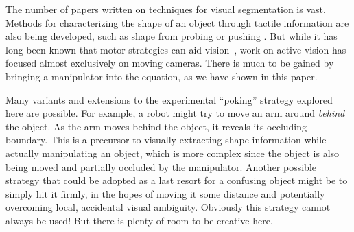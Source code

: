 \ifverbose
The number of papers written on techniques for visual segmentation is
vast.  Methods for characterizing the shape of an object through
tactile information are also being developed, such as shape from
probing 
\cite{paulos99fast} 
or pushing
\cite{moll01reconstructing}.
But while it has long
been known that motor strategies can aid
vision~\cite{ballard91animate}, work on active vision has focused
almost exclusively on moving cameras.  There is much to be gained by
bringing a manipulator into the equation, as we have shown in this
paper.  

Many variants and extensions to the experimental ``poking''
strategy explored here are possible.  For example, a robot might try
to move an arm around {\em behind} the object.  As the arm moves
behind the object, it reveals its occluding boundary.  This is a
precursor to visually extracting shape information while actually
manipulating an object, which is more complex since the object is also
being moved and partially occluded by the manipulator.  Another
possible strategy that could be adopted as a last resort for a
confusing object might be to simply hit it firmly, in the hopes of
moving it some distance and potentially overcoming local, accidental
visual ambiguity.  Obviously this strategy cannot always be used!  But
there is plenty of room to be creative here.
\fi


